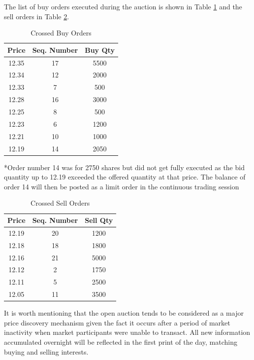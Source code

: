 The list of buy orders executed during the auction is shown in Table \ref{tab:openAuct4} and the sell orders in Table \ref{tab:openAuct5}. \\

\begin{table}[!ht]
   \centering
   \caption{Crossed Buy Orders\label{tab:openAuct4}}
   \hspace*{-3.3cm}
   \begin{tabular}{ccc} 
	Price & Seq. Number & Buy Qty  \\ \hline
	12.35 &  17 & 5500 \\
	12.34 & 12 & 2000\\	
	12.33 & 7  & 500\\			
	12.28 &  16 & 3000\\	
	12.25 & 8 & 500\\	
	12.23 & 6 & 1200\\		
	12.21  & 10& 1000\\		
	12.19 &  14  & 2050 		
   \end{tabular}
\begin{minipage}[t]{1\textwidth}
\small{*Order number 14 was for 2750 shares but did not get fully executed as the bid quantity up to 12.19 exceeded the offered quantity at that price. The balance of order 14 will then be posted as a limit order in the continuous trading session}
\end{minipage}   
\end{table}

	
\begin{table}[!ht]
   \centering
   \caption{Crossed Sell Orders\label{tab:openAuct5}}
   \hspace*{-3.3cm}
   \begin{tabular}{ccc} 
	Price & Seq. Number & Sell Qty  \\ \hline
	12.19 &  20 & 1200\\
	12.18 &  18 & 1800\\
	12.16 &  21 & 5000\\
	12.12  & 2  & 1750 \\		
	12.11  & 5  & 2500\\				
	12.05  & 11 & 3500 		
   \end{tabular}
\end{table}	




It is worth mentioning that the open auction tends to be considered as a major price discovery mechanism given the fact it occurs after a period of market inactivity when market participants were unable to transact. All new information accumulated overnight will be reflected in the first print of the day, matching buying and selling interests.  

